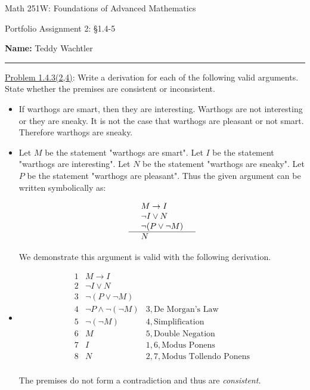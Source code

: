 \documentclass{article}
\theoremstyle{definition}
\begin{document}
	\begin{center}
		\Large{Math 251W: Foundations of Advanced Mathematics}

		\normalsize{Portfolio Assignment 2: \S 1.4-5}

		\vspace{0.2cm}

		\hfill {\bf Name:} Teddy Wachtler

		\vspace{0.25cm}
		\hrule
	\end{center}

	\vspace{0.3cm}

	\noindent \underline{Problem 1.4.3(2,4)}: Write a derivation for each of the following valid arguments. State whether the premises are consistent or inconsistent.

	\begin{itemize}
		\item[(2)] If warthogs are smart, then they are interesting. Warthogs are not interesting or they are sneaky. It is not the case that warthogs are pleasant or not smart. Therefore warthogs are sneaky.
	\end{itemize}

	\vspace{0.25cm}

	\begin{itemize}
		\item[(2)] Let $M$ be the statement "warthogs are smart". Let $I$ be the statement "warthogs are interesting". Let $N$ be the statement "warthogs are sneaky". Let $P$ be the statement "warthogs are pleasant". Thus the given argument can be written symbolically as:

		\[\begin{array}{llr}
			  & M \rightarrow I &\\
			  & \neg I \vee N &\\
			  & \neg (P \vee \neg M) &\\
			  \hline
			  & N &
		\end{array}\]

		We demonstrate this argument is valid with the following derivation.

		\item
		\[\begin{array}{llr}
			  1 & M \rightarrow I \\
			  2 & \neg I \vee N \\
			  3 & \neg (P \vee \neg M) \\
			  \hline
			  4 & \neg P \wedge \neg (\neg M) & 3, \mbox{De Morgan's Law} \\
			  5 & \neg (\neg M) & 4, \mbox{Simplification} \\
			  6 & M & 5, \mbox{Double Negation} \\
			  7 & I & 1, 6, \mbox{Modus Ponens} \\
			  8 & N & 2, 7, \mbox{Modus Tollendo Ponens} \\
		\end{array}\]

		The premises do not form a contradiction and thus are \emph{consistent.}

	\end{itemize}
\end{document}
